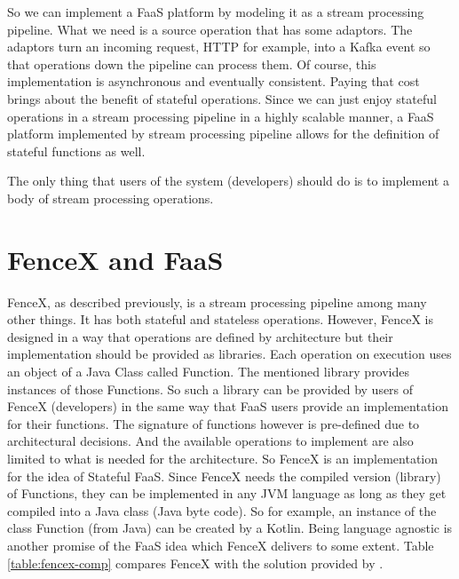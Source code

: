 \documentclass[a4]{report}
\begin{document}
    So we can implement a FaaS platform by modeling it as a stream processing pipeline.
    What we need is a source operation that has some adaptors.
    The adaptors turn an incoming request, HTTP for example, into a Kafka event so that operations down the pipeline can process them.
    Of course, this implementation is asynchronous and eventually consistent.
    Paying that cost brings about the benefit of stateful operations.
    Since we can just enjoy stateful operations in a stream processing pipeline in a highly scalable manner,
    a FaaS platform implemented by stream processing pipeline allows for the definition of stateful functions as well.

    The only thing that users of the system (developers) should do is to implement a body of stream processing operations.


    \section{FenceX and FaaS}
    FenceX, as described previously, is a stream processing pipeline among many other things.
    It has both stateful and stateless operations.
    However, FenceX is designed in a way that operations are defined by architecture but their implementation should be provided as libraries.
    Each operation on execution uses an object of a Java Class called Function.
    The mentioned library provides instances of those Functions.
    So such a library can be provided by users of FenceX (developers) in the same way that FaaS users provide an implementation for their functions.
    The signature of functions however is pre-defined due to architectural decisions.
    And the available operations to implement are also limited to what is needed for the architecture.
    So FenceX is an implementation for the idea of Stateful FaaS.
    Since FenceX needs the compiled version (library) of Functions, they can be implemented in any JVM language as long as they get compiled into a Java class (Java byte code).
    So for example, an instance of the class Function (from Java) can be created by a Kotlin\cite{kotlin}.
    Being language agnostic is another promise of the FaaS idea which FenceX delivers to some extent.
    Table \ref{table:fencex-comp} compares FenceX with the solution provided by \cite{Functions-as-a-Service-2020}.
\end{document}

